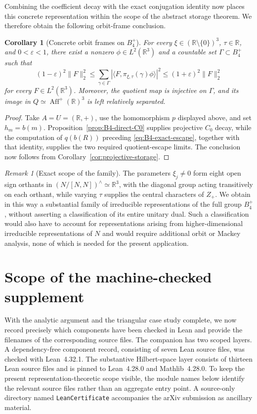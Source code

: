 \documentclass[reqno]{amsart}
\numberwithin{equation}{section}
\newtheorem{corollary}[theorem]{Corollary}
\theoremstyle{definition}
\theoremstyle{remark}
\newtheorem{remark}[theorem]{Remark}
\newcommand{\R}{\mathbb R}
\begin{document}
Combining the coefficient decay with the exact conjugation identity now
places this concrete representation within the scope of the abstract storage
theorem.  We therefore obtain the following orbit-frame conclusion.

\begin{corollary}[Concrete orbit frames on $B_4^+$]
\label{cor:B4-orbit-frame}
For every $\xi\in(\R\setminus\{0\})^3$, $\tau\in\R$, and
$0<\varepsilon<1$, there exist a nonzero $\phi\in L^2(\R^3)$ and a
countable set $\Gamma\subset B_4^+$ such that
\[
 (1-\varepsilon)^2\|F\|_2^2
 \leq\sum_{\gamma\in\Gamma}
 |\langle F,\pi_{\xi,\tau}(\gamma)\phi\rangle|^2
 \leq(1+\varepsilon)^2\|F\|_2^2
\]
for every $F\in L^2(\R^3)$.  Moreover, the quotient map is injective on
$\Gamma$, and its image in
$Q\simeq\operatorname{Aff}^+(\R)^3$ is left relatively separated.
\end{corollary}

\begin{proof}
Take $A=U=(\R,+)$, use the homomorphism $p$ displayed above, and set
$h_m=b(m)$.  Proposition~\ref{prop:B4-direct-C0} supplies projective $C_0$
decay, while the computation of $q(b(R))$ preceding
\eqref{eq:B4-exact-escape}, together with that identity, supplies the two
required quotient-escape limits.  The conclusion now follows from
Corollary~\ref{cor:projective-storage}.
\end{proof}

\begin{remark}[Exact scope of the family]
The parameters $\xi_j\neq0$ form eight open sign orthants in
$(N/[N,N])^\wedge\simeq\R^3$, with the diagonal group acting transitively on
each orthant, while varying $\tau$ supplies the central characters of $Z_+$.
We obtain in this way a substantial family of irreducible representations of
the full group $B_4^+$, without asserting a classification of its entire
unitary dual.  Such a classification would also have to account for
representations arising from higher-dimensional irreducible representations
of $N$ and would require additional orbit or Mackey analysis, none of which
is needed for the present application.
\end{remark}

\appendix

\section{Scope of the machine-checked supplement}
\label{app:lean}

With the analytic argument and the triangular case study complete, we now
record precisely which components have been checked in Lean and provide
the filenames of the corresponding source files.
The companion has two scoped layers.  A dependency-free component record,
consisting of seven Lean source files, was checked with Lean~4.32.1.  The
substantive Hilbert-space layer consists of thirteen Lean source files and is
pinned to Lean~4.28.0 and Mathlib~4.28.0.  To keep the present
representation-theoretic scope visible, the module names below identify the
relevant source files rather than an aggregate entry point.  A source-only
directory named \texttt{LeanCertificate} accompanies the arXiv submission as
ancillary material.
\end{document}
